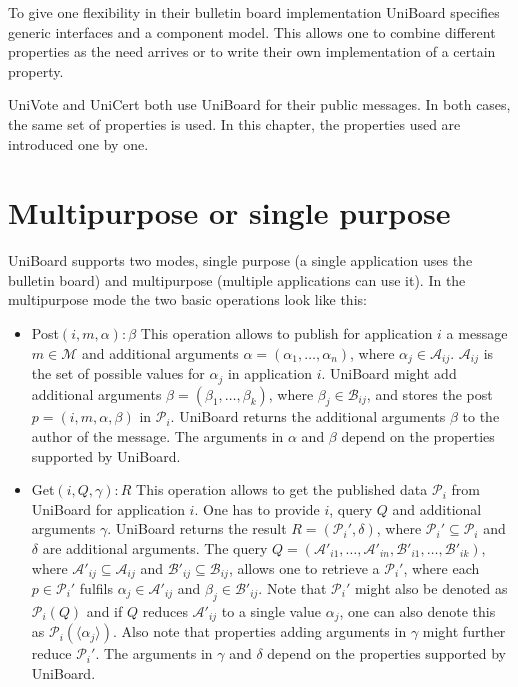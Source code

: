 \documentclass[bibtotoc,halfparskip,oneside]{scrreprt}
\begin{document}
To give one flexibility in their bulletin board implementation UniBoard specifies generic interfaces and a component model. This allows one to combine different properties as the need arrives or to write their own implementation of a certain property. 

UniVote and UniCert both use UniBoard for their public messages. In both cases, the same set of properties is used. In this chapter, the properties used are introduced one by one.


\section{Multipurpose or single purpose}

UniBoard supports two modes, single purpose (a single application uses the bulletin board) and multipurpose (multiple applications can use it). In the multipurpose mode the two basic operations look like this:

\begin{itemize}
	\item Post$(i ,m,\alpha):\beta$ \newline This operation allows to publish for application $i$ a message $m \in \mathcal{M}$ and additional arguments $\alpha=(\alpha_1,\dots,\alpha_n)$, where $\alpha_j \in \mathcal{A}_{ij}$. $\mathcal{A}_{ij}$ is the set of possible values for $\alpha_j$ in application $i$. UniBoard might add additional arguments $\beta=(\beta_1,\dots,\beta_k)$, where $\beta_j \in \mathcal{B}_{ij}$, and stores the post $p=(i, m,\alpha,\beta)$ in $\mathcal{P}_i$. UniBoard returns the additional arguments $\beta$ to the author of the message. The arguments in $\alpha$ and $\beta$ depend on the properties supported by UniBoard.
	\item Get$(i, Q, \gamma):R$ \newline This operation allows to get the published data $\mathcal{P}_i$ from UniBoard for application $i$. One has to provide $i$, query $Q$ and additional arguments $\gamma$. UniBoard returns the result $R=(\mathcal{P}_i',\delta)$, where  $\mathcal{P}_i'\subseteq\mathcal{P}_i$ and $\delta$ are additional arguments. The query $Q=(\mathcal{A}'_{i1}, \dots , \mathcal{A}'_{in}, \mathcal{B}'_{i1}, \dots, \mathcal{B}'_{ik})$, where $\mathcal{A}'_{ij} \subseteq  \mathcal{A}_{ij}$ and  $\mathcal{B}'_{ij} \subseteq  \mathcal{B}_{ij}$, allows one to retrieve a $\mathcal{P}_i'$, where each $p\in \mathcal{P}_i'$ fulfils $\alpha_j \in \mathcal{A}'_{ij}$ and $\beta_j \in \mathcal{B}'_{ij}$. Note that $\mathcal{P}_i'$ might also be denoted as $\mathcal{P}_i(Q)$ and if $Q$ reduces $\mathcal{A}'_{ij}$ to a single value $\alpha_j$, one can also denote this as $\mathcal{P}_i(\langle\alpha_j\rangle)$. Also note that properties adding arguments in $\gamma$ might further reduce $\mathcal{P}_i'$. The arguments in $\gamma$ and $\delta$ depend on the properties supported by UniBoard.
\end{itemize}
\end{document}
